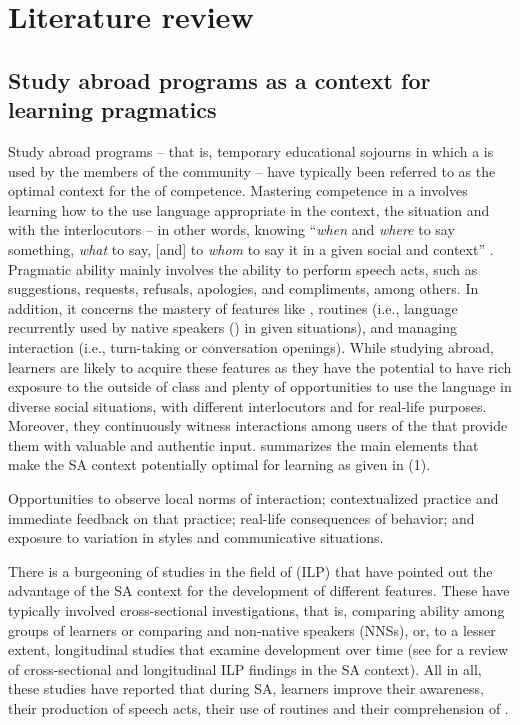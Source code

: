\documentclass[output=paper]{langsci/langscibook}
\begin{document}
\section{Literature review}
\largerpage
\subsection{Study abroad programs as a context for learning pragmatics}
Study abroad programs – that is, temporary educational sojourns in which a  is used by the members of the community \citep{Taguchi2015contextually} – have typically been referred to as the optimal context for the  of  competence. Mastering  competence in a  involves learning how to the use language appropriate in the context, the situation and with the interlocutors – in other words, knowing “\textit{when} and \textit{where} to say something, \textit{what} to say, [and] to \textit{whom} to say it in a given social and  context” \citep[314]{García1989}. Pragmatic ability mainly involves the ability to perform speech acts, such as suggestions, requests, refusals, apologies, and compliments, among others. In addition, it concerns the mastery of  features like ,  routines (i.e.,  language recurrently used by native speakers () in given situations), and managing interaction (i.e., turn-taking or conversation openings).  While studying abroad, learners are likely to acquire these features as they have the potential to have rich exposure to the  outside of class and plenty of opportunities to use the language in diverse social situations, with different interlocutors and for real-life purposes. Moreover, they continuously witness interactions among users of the  that provide them with valuable and authentic input.  \citet[4]{Taguchi2015contextually} summarizes the main elements that make the SA context potentially optimal for  learning as given in (1).

\ea%
  \ea Opportunities to observe local norms of interaction; 
  \ex contextualized  practice and immediate feedback on that practice;
  \ex real-life consequences of  behavior; and 
  \ex exposure to variation in styles and communicative situations.
  \z
\z
    
There is a burgeoning of studies in the field of   (ILP) that have pointed out the advantage of the SA context for the development of different  features. These have typically involved cross-sectional investigations, that is, comparing  ability among groups of  learners or comparing   and non-native speakers ({NNSs}), or, to a lesser extent, longitudinal studies that examine  development over time (see \citealt{Alcón-Soler2014} for a review of cross-sectional and longitudinal ILP findings in the SA context). All in all, these studies have reported that during SA, learners improve their  awareness, their production of speech acts, their use of  routines and their comprehension of . 
\end{document}
